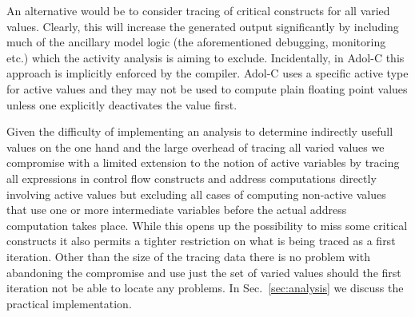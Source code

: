 \documentclass{article}
\newcommand{\refsec}[1]{{Sec.~\ref{#1}}}
\begin{document}
An alternative would be to consider tracing of critical constructs for all varied values. 
Clearly, this will increase the generated output significantly by including much 
of the ancillary model logic (the aforementioned debugging, monitoring etc.) which 
the activity analysis is aiming to exclude. 
Incidentally, in Adol-C this approach is implicitly enforced by the compiler. 
Adol-C uses a specific  
active type for active values and they may not be used to 
compute plain floating point values unless one 
explicitly deactivates the value first. 

Given the difficulty of implementing an analysis to determine indirectly usefull values 
on the one hand and the large overhead of tracing all varied values we 
compromise with a limited extension to the notion of active variables by tracing  
all expressions in control flow constructs and address computations directly involving active values
but excluding all cases of computing non-active values that use one or more intermediate 
variables before the actual address computation takes place. 
While this opens up the possibility to miss some critical constructs 
it also permits a tighter restriction on what is being traced as a first iteration. 
Other than the size of the tracing data  there is no problem with abandoning the compromise
and use just the set of varied values should the first iteration not be able to 
locate any problems.    
In \refsec{sec:analysis} we discuss the practical implementation.

\end{document}
